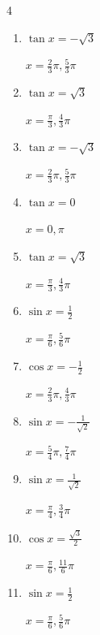 \begin{multicols}{4}
\begin{enumerate}
\columnbreak %

\resetques

  \item $\displaystyle \tan{x}  = -\sqrt{3}$

        $\displaystyle x = \frac{2}{3}\pi , \frac{5}{3}\pi$

  \item $\displaystyle \tan{x}  = \sqrt{3}$

        $\displaystyle x = \frac{\pi}{3} , \frac{4}{3}\pi$

  \item $\displaystyle \tan{x}  = -\sqrt{3}$

        $\displaystyle x = \frac{2}{3}\pi , \frac{5}{3}\pi$

  \item $\displaystyle \tan{x}  = 0$

        $\displaystyle x = 0 , \pi$

  \item $\displaystyle \tan{x}  = \sqrt{3}$

        $\displaystyle x = \frac{\pi}{3} , \frac{4}{3}\pi$

  \item $\displaystyle \sin{x}  = \frac{1}{2}$

        $\displaystyle x = \frac{\pi}{6} , \frac{5}{6}\pi$

  \item $\displaystyle \cos{x}  = -\frac{1}{2}$

        $\displaystyle x = \frac{2}{3}\pi , \frac{4}{3}\pi$

  \item $\displaystyle \sin{x}  = -\frac{1}{\sqrt{2}}$

        $\displaystyle x = \frac{5}{4}\pi , \frac{7}{4}\pi$

  \item $\displaystyle \sin{x}  = \frac{1}{\sqrt{2}}$

        $\displaystyle x = \frac{\pi}{4} , \frac{3}{4}\pi$

  \item $\displaystyle \cos{x}  = \frac{\sqrt{3}}{2}$

        $\displaystyle x = \frac{\pi}{6} , \frac{11}{6}\pi$

  \item $\displaystyle \sin{x}  = \frac{1}{2}$

        $\displaystyle x = \frac{\pi}{6} , \frac{5}{6}\pi$


\end{enumerate}
\end{multicols}

